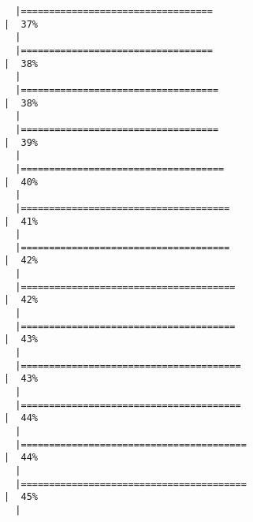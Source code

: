 \documentclass[12pt]{article}
\begin{document}
\begin{verbatim}
  |==================================                                                        |  37%
  |                                                                                                
  |==================================                                                        |  38%
  |                                                                                                
  |===================================                                                       |  38%
  |                                                                                                
  |===================================                                                       |  39%
  |                                                                                                
  |====================================                                                      |  40%
  |                                                                                                
  |=====================================                                                     |  41%
  |                                                                                                
  |=====================================                                                     |  42%
  |                                                                                                
  |======================================                                                    |  42%
  |                                                                                                
  |======================================                                                    |  43%
  |                                                                                                
  |=======================================                                                   |  43%
  |                                                                                                
  |=======================================                                                   |  44%
  |                                                                                                
  |========================================                                                  |  44%
  |                                                                                                
  |========================================                                                  |  45%
  |                                                                                                

\end{verbatim}
\end{document}
